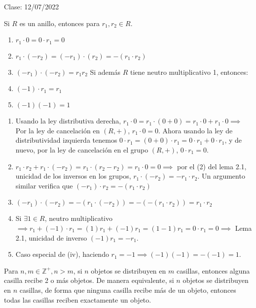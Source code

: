 

Clase: 12/07/2022

\begin{lema}[3.1]
    Si $R$ es un anillo, entonces para $r_1,r_2\in R$.
    \begin{enumerate}
        \item $r_1\cdot 0=0\cdot r_1=0$
        \item $r_1\cdot(-r_2)=(-r_1)\cdot (r_2)= -(r_1\cdot r_2)$
        \item $(-r_1)\cdot (-r_2)=r_1r_2$
        Si además $R$ tiene neutro multiplicativo 1, entonces: 
        \item $(-1)\cdot r_1 =r_1$
        \item $(-1)(-1)=1$
    \end{enumerate}
    \begin{dem}
        \begin{enumerate}
            \item Usando la ley distributiva derecha, $r_1\cdot 0=r_1\cdot(0+0)=r_1\cdot0 +r_1\cdot0\implies$ Por la ley de cancelación en $(R,+)$, $r_1\cdot 0 = 0$. Ahora usando la ley de distributividad izquierda tenemos 
            $0\cdot r_1=(0+0)\cdot r_1 = 0\cdot r_1+0\cdot r_1$, y de nuevo, por la ley de cancelación en el grupo $(R,+)$, $0\cdot r_1=0$. 
            \item $r_1\cdot r_2 +r_1\cdot (-r_2)=r_1\cdot (r_2-r_2)=r_1\cdot 0 =0\implies$ por el (2) del lema 2.1, unicidad de los inversos en los grupos, $r_1\cdot (-r_2)=-r_1\cdot r_2$. Un argumento similar verifica que $(-r_1)\cdot r_2 =-(r_1\cdot r_2)$
            \item $(-r_1)\cdot (-r_2)=-(r_1\cdot (-r_2))=-(-(r_1\cdot r_2))=r_1\cdot r_2 $
            \item Si $\exists 1\in R$, neutro multiplicativo $\implies r_1+(-1)\cdot r_1= (1)r_1+(-1)r_1=(1-1)r_1=0\cdot r_1=0\implies$ Lema 2.1, unicidad de inverso $(-1)r_1=-r_1$.
            \item Caso especial de (iv), haciendo $r_1=-1\implies (-1)(-1)=-(-1)=1$.
        \end{enumerate}
    \end{dem}

\end{lema}

\begin{nota}
    Para $n,m\in\mathbb{Z}^+,n>m$, si $n$ objetos se distribuyen en $m$ casillas, entonces alguna casilla recibe 2 o más objetos. De manera equivalente, si $n$ objetos se distribuyen en $n$ casillas, de forma que ninguna casilla recibe más de un objeto, entonces todas las casillas reciben exactamente un objeto. 
\end{nota}

